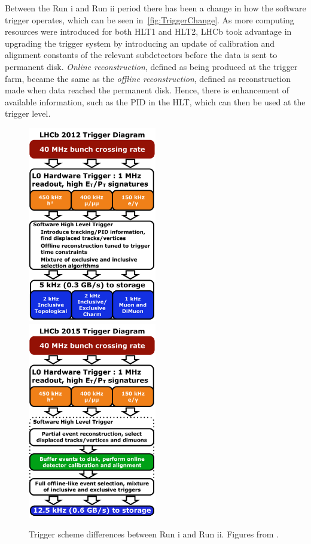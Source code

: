 Between the Run \Rn{1} and Run \Rn{2} period there has been a change in how the software trigger operates, which can be seen in~\autoref{fig:TriggerChange}. As more computing resources were introduced for both \Gls{HLT1} and \Gls{HLT2}, \Gls{LHCb} took advantage in upgrading the trigger system by introducing an update of calibration and alignment constants of the relevant subdetectors before the data is sent to permanent disk. \textit{Online reconstruction}, defined as being produced at the trigger farm, became the same as the \textit{offline reconstruction}, defined as reconstruction made when data reached the permanent disk. Hence, there is enhancement of available information, such as the \Gls{PID} in the \Gls{HLT}, which can then be used at the trigger level. 


\begin{figure}[!h]
	\centering
	\includegraphics[width = 0.5\textwidth]{figs/detector/LHCb_Trigger_RunIAlg.pdf}%
	\includegraphics[width = 0.5\textwidth]{figs/detector/LHCb_Trigger_RunII.pdf}%
	\caption{Trigger scheme differences between Run \Rn{1} and Run \Rn{2}. Figures from \cite{triggerscheme}.}  
	\label{fig:TriggerChange}
\end{figure}


